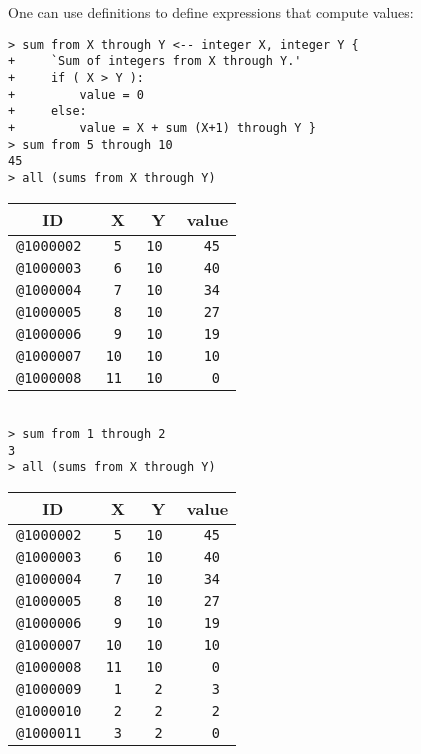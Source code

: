\documentclass[12pt]{article}
\newenvironment{indpar}[1][0.3in]%
	{\begin{list}{}%
		     {\setlength{\itemsep}{0in}%
		      \setlength{\topsep}{0in}%
		      \setlength{\parsep}{1ex}%
		      \setlength{\labelwidth}{#1}%
		      \setlength{\leftmargin}{#1}%
		      \addtolength{\leftmargin}{\labelsep}}%
	 \item}%
	{\end{list}}
\begin{document}
One can use definitions to define expressions that compute values:

\begin{indpar}
\verb|> sum from X through Y <-- integer X, integer Y {| \\
\verb|+     `Sum of integers from X through Y.'| \\
\verb|+     if ( X > Y ):| \\
\verb|+         value = 0| \\
\verb|+     else:| \\
\verb|+         value = X + sum (X+1) through Y }| \\
\verb|> sum from 5 through 10| \\
\verb|45| \\
\verb|> all (sums from X through Y)| \\
\begin{tabular}{|r|r|r|r|}
\hline
\multicolumn{1}{|c}{\bf ID} &
\multicolumn{1}{|c}{\bf X} &
\multicolumn{1}{|c}{\bf Y} &
\multicolumn{1}{|c|}{\bf value} \\
\hline
\tt @1000002 & \tt 5	& \tt	10	& \tt 45 \\
\tt @1000003 & \tt 6	& \tt	10	& \tt 40 \\
\tt @1000004 & \tt 7	& \tt	10	& \tt 34 \\
\tt @1000005 & \tt 8	& \tt	10	& \tt 27 \\
\tt @1000006 & \tt 9	& \tt	10	& \tt 19 \\
\tt @1000007 & \tt 10	& \tt	10	& \tt 10 \\
\tt @1000008 & \tt 11	& \tt	10	& \tt 0 \\
\hline
\end{tabular} \\
\verb|> sum from 1 through 2| \\
\verb|3| \\
\verb|> all (sums from X through Y)| \\
\begin{tabular}{|r|r|r|r|}
\hline
\multicolumn{1}{|c}{\bf ID} &
\multicolumn{1}{|c}{\bf X} &
\multicolumn{1}{|c}{\bf Y} &
\multicolumn{1}{|c|}{\bf value} \\
\hline
\tt @1000002 & \tt 5	& \tt	10	& \tt 45 \\
\tt @1000003 & \tt 6	& \tt	10	& \tt 40 \\
\tt @1000004 & \tt 7	& \tt	10	& \tt 34 \\
\tt @1000005 & \tt 8	& \tt	10	& \tt 27 \\
\tt @1000006 & \tt 9	& \tt	10	& \tt 19 \\
\tt @1000007 & \tt 10	& \tt	10	& \tt 10 \\
\tt @1000008 & \tt 11	& \tt	10	& \tt 0 \\
\tt @1000009 & \tt 1	& \tt	2	& \tt 3 \\
\tt @1000010 & \tt 2	& \tt	2	& \tt 2 \\
\tt @1000011 & \tt 3	& \tt	2	& \tt 0 \\
\hline
\end{tabular}
\end{indpar}
\end{document}
